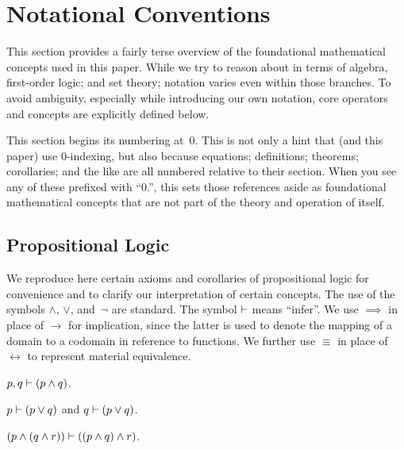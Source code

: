 
\section{Notational Conventions}
This section provides a fairly terse overview of the foundational
  mathematical concepts used in this paper.
While we try to reason about \tame{} in terms of algebra,
  first-order logic;
  and set theory;
    notation varies even within those branches.
To avoid ambiguity,
  especially while introducing our own notation,
  core operators and concepts are explicitly defined below.

This section begins its numbering at~0.
This is not only a hint that \tame{} (and this paper) use 0-indexing,
  but also because equations; definitions; theorems; corollaries; and the
  like are all numbered relative to their section.
When you see any of these prefixed with ``0.'',
  this sets those references aside as foundational mathematical concepts
    that are not part of the theory and operation of \tame{} itself.


\subsection{Propositional Logic}
We reproduce here certain axioms and corollaries of propositional logic for
  convenience and to clarify our interpretation of certain concepts.
The use of the symbols $\land$, $\lor$, and~$\neg$ are standard.
\indexsym{}
The symbol $\vdash$ means ``infer''.
We use $\implies$ in place of $\rightarrow$ for implication,
  since the latter is used to denote the mapping of a domain to a codomain
  in reference to functions.
We further use $\equiv$ in place of $\leftrightarrow$ to represent material
  equivalence.

\indexsym{}
\begin{definition}
  $p,q \vdash (p\land q)$.
\end{definition}

\indexsym{}
\begin{definition}
  $p \vdash (p\lor q)$ and $q \vdash (p\lor q)$.
\end{definition}

\begin{definition}
  $(p \land (q \land r)) \vdash ((p \land q) \land r)$.
\end{definition}

